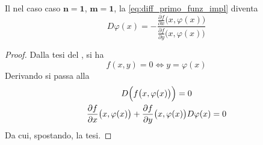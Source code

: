 \begin{corollary}[Differenziale Primo della Funzione Implicita - Caso $n=1$, $m=1$]
	\label{coro:diff_primo_funz_impl_n1_m1}
	Il  nel caso caso $\boldsymbol{n=1}$, $\boldsymbol{m=1}$, la \cref{eq:diff_primo_funz_impl} diventa
	\[
		D\varphi(x) = -\frac{
			\frac{\partial f}{\partial x} \bigl( x, \varphi(x) \bigr)
		}{
			\frac{\partial f}{\partial y} \bigl( x, \varphi(x) \bigr)
		}
	\]
	\begin{proof}
		Dalla tesi del , si ha
		\[f(x,y) = 0 \iff y = \varphi(x)\]
		Derivando si passa alla
		\[
			\begin{gathered}
				D\Bigl( f\bigl(x,\varphi(x) \bigr) \Bigr) = 0\\
				\frac{\partial f}{\partial x}\bigl( x, \varphi(x) \bigr) + \frac{\partial f}{\partial y}\bigl( x, \varphi(x) \bigr) D\varphi(x) = 0
			\end{gathered}
		\]
		Da cui, spostando, la tesi.
	\end{proof}
\end{corollary}
\cbstart
